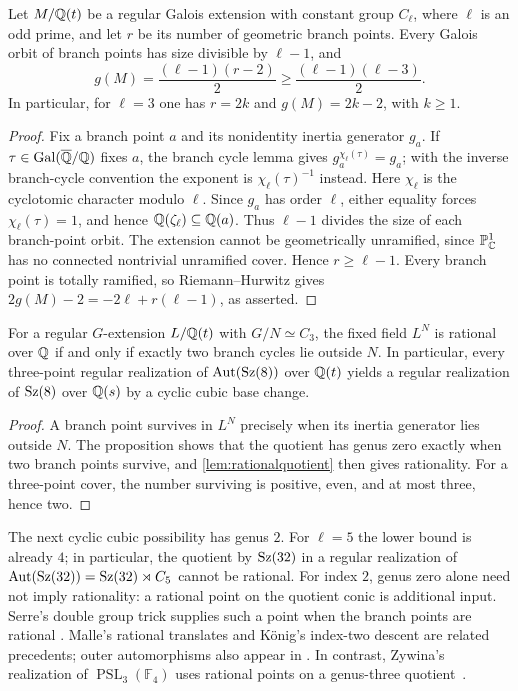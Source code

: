 \begin{proposition}\label{prop:cyclic-prime}
Let $M/\mathbb{Q}(t)$ be a regular Galois extension with constant group $C_\ell$,
where $\ell$ is an odd prime, and let $r$ be its number of geometric branch
points. Every Galois orbit of branch points has size divisible by
$\ell-1$, and
\[
 g(M)=\frac{(\ell-1)(r-2)}{2}
 \geq\frac{(\ell-1)(\ell-3)}{2}.
\]
In particular, for $\ell=3$ one has $r=2k$ and $g(M)=2k-2$, with $k\geq1$.
\end{proposition}
\begin{proof}
Fix a branch point $a$ and its nonidentity inertia generator $g_a$.
If $\tau\in\operatorname{Gal}(\overline{\mathbb{Q}}/\mathbb{Q})$ fixes $a$, the branch cycle lemma gives
$g_a^{\chi_\ell(\tau)}=g_a$; with the inverse branch-cycle convention the
exponent is $\chi_\ell(\tau)^{-1}$ instead.  Here $\chi_\ell$ is the
cyclotomic character modulo $\ell$.  Since $g_a$ has order $\ell$, either
equality forces $\chi_\ell(\tau)=1$, and hence
$\mathbb{Q}(\zeta_\ell)\subseteq\mathbb{Q}(a)$.
Thus $\ell-1$ divides the size of each branch-point orbit. The extension
cannot be geometrically unramified, since $\mathbb{P}^1_{\mathbb{C}}$ has no connected
nontrivial unramified cover. Hence $r\geq\ell-1$. Every branch point is
totally ramified, so Riemann--Hurwitz gives
$2g(M)-2=-2\ell+r(\ell-1)$, as asserted.
\end{proof}

\begin{corollary}\label{cor:threepoint}
For a regular $G$-extension $L/\mathbb{Q}(t)$ with $G/N\simeq C_3$, the fixed
field $L^N$ is rational over $\mathbb{Q}$ if and only if exactly two branch cycles
lie outside $N$. In particular, every three-point regular realization
of $\operatorname{Aut}(\operatorname{Sz}(8))$ over $\mathbb{Q}(t)$ yields a regular realization of $\operatorname{Sz}(8)$
over $\mathbb{Q}(s)$ by a cyclic cubic base change.
\end{corollary}
\begin{proof}
A branch point survives in $L^N$ precisely when its inertia generator
lies outside $N$. The proposition shows that the quotient has genus zero
exactly when two branch points survive, and \cref{lem:rationalquotient}
then gives rationality. For a three-point cover, the number surviving is
positive, even, and at most three, hence two.
\end{proof}

The next cyclic cubic possibility has genus $2$. For $\ell=5$ the lower
bound is already $4$; in particular, the quotient by $\operatorname{Sz}(32)$ in a
regular realization of $\operatorname{Aut}(\operatorname{Sz}(32))=\operatorname{Sz}(32)\rtimes C_5$ cannot be rational.
For index $2$, genus zero alone need not imply rationality: a rational
point on the quotient conic is additional input. Serre's double group
trick supplies such a point when the branch points are rational
\cite[Lemma~4.5.1]{Serre2008}. Malle's rational translates
\cite{Malle1991} and K\"onig's index-two descent
\cite[Proposition~3]{Konig2017} are related precedents; outer automorphisms
also appear in \cite{Malle1992}. In contrast, Zywina's realization of
$\operatorname{PSL}_3(\mathbb F_4)$ uses rational points on a genus-three
quotient~\cite[\S1]{Zywina2025}.

